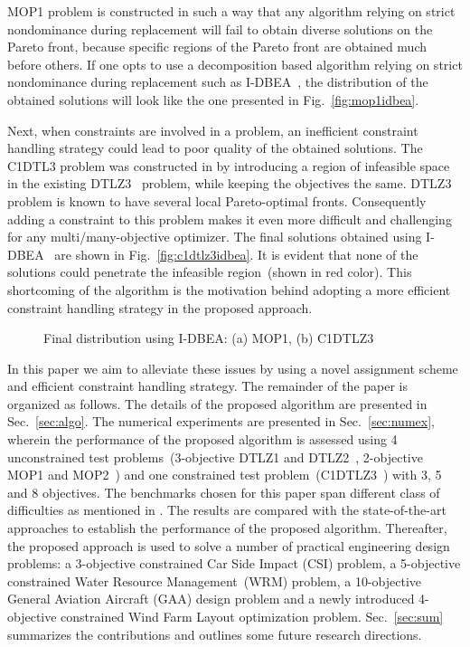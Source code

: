 MOP1 problem is constructed in such a way that any algorithm relying on strict nondominance during replacement will fail to obtain diverse solutions on the Pareto front, because specific regions of the Pareto front are obtained much before others. If one opts to use a decomposition based algorithm relying on strict nondominance during replacement such as I-DBEA~\cite{Asafmany2015}, the distribution of the obtained solutions will look like the one presented in Fig.~\ref{fig:mop1idbea}. 

Next, when constraints are involved in a problem, an inefficient constraint handling strategy could lead to poor quality of the obtained solutions. The C1DTL3 problem was constructed in \cite{Deb2014adaptive} by introducing a region of infeasible space in the existing DTLZ3~\cite{deb2005scalable} problem, while keeping the objectives the same. DTLZ3 problem is known to have several local Pareto-optimal fronts. Consequently adding a constraint to this problem makes it even more difficult and challenging for any multi/many-objective optimizer. The final solutions obtained using I-DBEA~\cite{Asafmany2015} are shown in Fig.~\ref{fig:c1dtlz3idbea}. It is evident that none of the solutions could penetrate the infeasible region~(shown in red color). This shortcoming of the algorithm is the motivation behind adopting a more efficient constraint handling strategy in the proposed approach.

\begin{figure}[!htb]
	\centering
	\label{fig:rationale}
	\caption{Final distribution using I-DBEA: (a) MOP1, (b) C1DTLZ3}
\end{figure}

In this paper we aim to alleviate these issues by using a novel assignment scheme and efficient constraint handling strategy. The remainder of the paper is organized as follows. The details of the proposed algorithm are presented in Sec.~\ref{sec:algo}. The numerical experiments are presented in Sec.~\ref{sec:numex}, wherein the performance of the proposed algorithm is assessed using 4 unconstrained test problems~(3-objective DTLZ1 and DTLZ2~\cite{deb2005scalable}, 2-objective MOP1 and MOP2~\cite{liu2014mop}) and one constrained test problem~(C1DTLZ3~\cite{Deb2014adaptive}) with 3, 5 and 8 objectives. The benchmarks chosen for this paper span different class of difficulties as mentioned in \cite{liu2014mop, Wang2016adaptive}. The results are compared with the state-of-the-art approaches to establish the performance of the proposed algorithm. Thereafter, the proposed approach is used to solve a number of practical engineering design problems: a 3-objective constrained Car Side Impact (CSI) problem, a 5-objective constrained Water Resource Management~(WRM) problem, a 10-objective General Aviation Aircraft (GAA) design problem and a newly introduced 4-objective constrained Wind Farm Layout optimization problem. Sec.~\ref{sec:sum} summarizes the contributions and outlines some future research directions.


